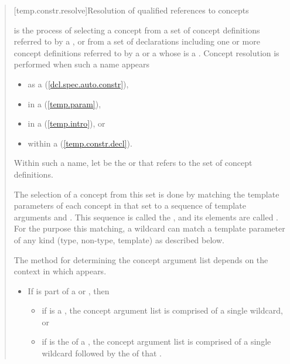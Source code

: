\begin{quote}
\begin{addedblock}
[temp.constr.resolve]{Resolution of qualified references to concepts}

\pnum
{} is the process of selecting a concept 
from a set of concept definitions referred to by a
,
% 
or from a set of declarations including one or more concept definitions
referred to by a  or a 
whose  is a .
% 
Concept resolution is performed when such a name appears
\begin{itemize}
\item as a  (\ref{dcl.spec.auto.constr}), 
\item in a  (\ref{temp.param}),
\item in a  (\ref{temp.intro}), or
\item within a  (\ref{temp.constr.decl}).
\end{itemize}
Within such a name, let  be the  or
 that refers to the set of concept definitions.

\pnum
The selection of a concept from this set is done by matching the 
template parameters of each concept in that set to a sequence of template 
arguments and .
% 
This sequence is called the , and its elements
are called .
% 
For the purpose this matching, a wildcard can match a template 
parameter of any kind (type, non-type, template) as described below.

\pnum
The method for determining the concept argument list depends on the
context in which  appears.
% 
\begin{itemize}
\item If  is part of a  or 
,
then
  \begin{itemize}
  \item if  is a , the concept 
  argument list is comprised of a single wildcard, or
  \item if  is the  of a 
  , the concept argument list is comprised of a
  single wildcard followed by the  of that 
  .
  \end{itemize}


\end{itemize}
\end{addedblock}
\end{quote}
